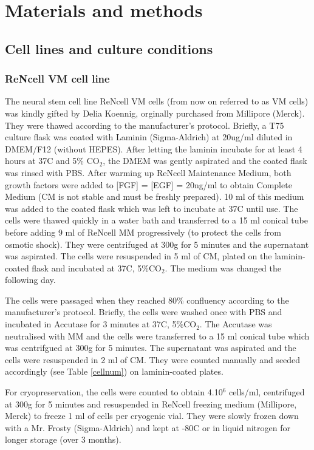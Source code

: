 \documentclass[onecolumn,10pt]{asme2ej}
\begin{document}
\section{Materials and methods}

\subsection{Cell lines and culture conditions}
\subsubsection{ReNcell VM cell line}
The neural stem cell line ReNcell VM cells (from now on referred to as VM cells) was kindly gifted by Delia Koennig, orginally purchased from Millipore (Merck). They were thawed according to the manufacturer's protocol. Briefly, a T75 culture flask was coated with Laminin (Sigma-Aldrich) at 20ug/ml diluted in DMEM/F12 (without HEPES). After letting the laminin incubate for at least 4 hours at 37C and 5\% CO$_2$, the DMEM was gently aspirated and the coated flask was rinsed with PBS. After warming up ReNcell Maintenance Medium, both growth factors were added to [FGF] = [EGF] = 20ng/ml to obtain Complete Medium (CM is not stable and must be freshly prepared). 10 ml of this medium was added to the coated flask which was left to incubate at 37C until use. The cells were thawed quickly in a water bath and transferred to a 15 ml conical tube before adding 9 ml of ReNcell MM progressively (to protect the cells from osmotic shock). They were centrifuged at 300g for 5 minutes and the supernatant was aspirated. The cells were resuspended in 5 ml of CM, plated on the laminin-coated flask and incubated at 37C, 5\%CO$_2$. The medium was changed the following day.

The cells were passaged when they reached 80\% confluency according to the manufacturer's protocol. Briefly, the cells were washed once with PBS and incubated in Accutase for 3 minutes at 37C, 5\%CO$_2$. The Accutase was neutralised with MM and the cells were transferred to a 15 ml conical tube which was centrifgued at 300g for 5 minutes. The supernatant was aspirated and the cells were resuspended in 2 ml of CM. They were counted manually and seeded accordingly (see Table \ref{cellnum}) on laminin-coated plates.

For cryopreservation, the cells were counted to obtain 4.10$^6$ cells/ml, centrifuged at 300g for 5 minutes and resuspended in ReNcell freezing medium (Millipore, Merck) to freeze 1 ml of cells per cryogenic vial. They were slowly frozen down with a Mr. Frosty (Sigma-Aldrich) and kept at -80C or in liquid nitrogen for longer storage (over 3 months).
\end{document}
